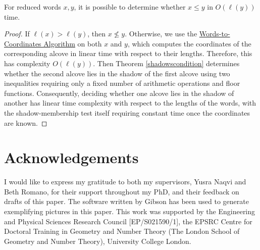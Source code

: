 \documentclass[11pt]{article}
\begin{document}



\begin{corollary}
For reduced words $x,y$, it is possible to determine whether $x\leq y$ in $O(\ell(y))$ time. 
\end{corollary}
\begin{proof}
    If $\ell(x)>\ell(y)$, then $x\not\leq y$. Otherwise, we use the \hyperref[algorithm]{Words-to-Coordinates Algorithm} on both $x$ and $y$, which computes the coordinates of the corresponding alcove in linear time with respect to their lengths. Therefore, this has complexity $O(\ell(y))$. Then Theorem \ref{shadowscondition} determines whether the second alcove lies in the shadow of the first alcove using two inequalities requiring only a fixed number of arithmetic operations and floor functions. Consequently, deciding whether one alcove lies in the shadow of another has linear time complexity with respect to the lengths of the words, with the shadow-membership test itself requiring constant time once the coordinates are known.
\end{proof}

\section*{Acknowledgements}
I would like to express my gratitude to both my supervisors, Yusra Naqvi and Beth Romano, for their support throughout my PhD, and their feedback on drafts of this paper. The software written by Gibson \cite{GIBSON} has been used to generate exemplifying pictures in this paper. This work was supported by the Engineering and Physical Sciences
Research Council [EP/S021590/1], the EPSRC Centre for Doctoral Training in Geometry and
Number Theory (The London School of Geometry and Number Theory), University College
London.
\end{document}
